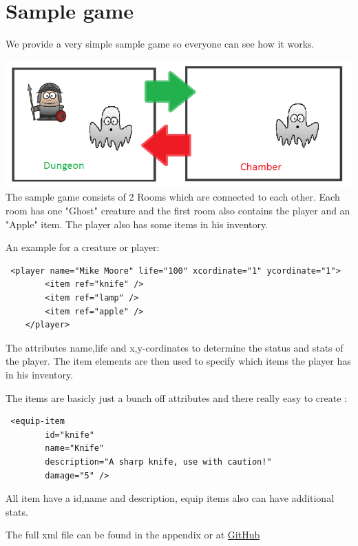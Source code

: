 \chapter{Sample game}

We provide a very simple sample game so everyone can see how it works. 

\includegraphics[scale=0.75]{assets/SampleGame.png}
 The sample game consists of 2 Rooms which are connected to each other. Each room has one "Ghost" creature and the first room also contains the player and an "Apple" item.  The player also has some items in his inventory.
 
 An example for a creature or player:
 \begin{verbatim}
 <player name="Mike Moore" life="100" xcordinate="1" ycordinate="1">
        <item ref="knife" />
        <item ref="lamp" />
        <item ref="apple" />
    </player>
 \end{verbatim}
 The  attributes name,life and x,y-cordinates to determine the status and stats of the player.
 The item elements are then used to specify which items the player has in his inventory.
 
 The items are basicly just a bunch off attributes and there really easy to create :
 \begin{verbatim}
 <equip-item
        id="knife"
        name="Knife"
        description="A sharp knife, use with caution!"
        damage="5" />
 \end{verbatim}
All item have a id,name and description, equip items also can have additional stats.

The full xml file can be found in the appendix or at \href{https://github.com/kerko/epic/blob/dev/project/demo/demo.xml}{GitHub}